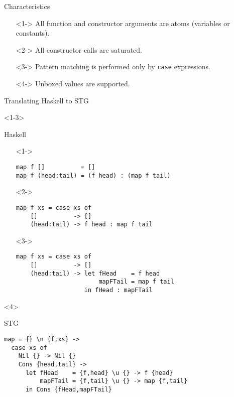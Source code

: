 \documentclass{beamer}
\begin{document}
\begin{frame}{Characteristics}
  \begin{itemize}
  \item[]<1-> All function and constructor arguments are atoms (variables or
    constants).
  \item[]<2-> All constructor calls are saturated.
  \item[]<3-> Pattern matching is performed only by \texttt{case} expressions.
  \item[]<4-> Unboxed values are supported.
  \end{itemize}
\end{frame}

\begin{frame}[fragile]{Translating Haskell to STG}
  \begin{onlyenv}<1-3>
    \begin{block}{Haskell}
      \begin{itemize}
      \item[]<1-> \begin{verbatim}
map f []          = []
map f (head:tail) = (f head) : (map f tail)
        \end{verbatim}
      \item[]<2-> \begin{verbatim}
map f xs = case xs of
    []          -> []
    (head:tail) -> f head : map f tail
        \end{verbatim}
      \item[]<3-> \begin{verbatim}
map f xs = case xs of
    []          -> []
    (head:tail) -> let fHead    = f head
                       mapFTail = map f tail
                   in fHead : mapFTail
        \end{verbatim}
      \end{itemize}
    \end{block}
  \end{onlyenv}

  \begin{onlyenv}<4>
    \begin{block}{STG}
      \begin{verbatim}
map = {} \n {f,xs} ->
  case xs of
    Nil {} -> Nil {}
    Cons {head,tail} ->
      let fHead    = {f,head} \u {} -> f {head}
          mapFTail = {f,tail} \u {} -> map {f,tail}
      in Cons {fHead,mapFTail}
      \end{verbatim}
    \end{block}
  \end{onlyenv}
\end{frame}
\end{document}
